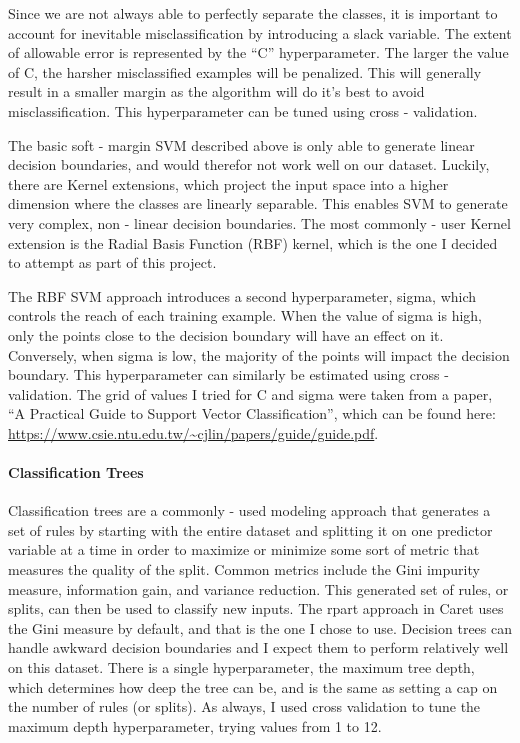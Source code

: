 \documentclass[
]{article}
\begin{document}
Since we are not always able to perfectly separate the classes, it is
important to account for inevitable misclassification by introducing a
slack variable. The extent of allowable error is represented by the
``C'' hyperparameter. The larger the value of C, the harsher
misclassified examples will be penalized. This will generally result in
a smaller margin as the algorithm will do it's best to avoid
misclassification. This hyperparameter can be tuned using cross -
validation.

The basic soft - margin SVM described above is only able to generate
linear decision boundaries, and would therefor not work well on our
dataset. Luckily, there are Kernel extensions, which project the input
space into a higher dimension where the classes are linearly separable.
This enables SVM to generate very complex, non - linear decision
boundaries. The most commonly - user Kernel extension is the Radial
Basis Function (RBF) kernel, which is the one I decided to attempt as
part of this project.

The RBF SVM approach introduces a second hyperparameter, sigma, which
controls the reach of each training example. When the value of sigma is
high, only the points close to the decision boundary will have an effect
on it. Conversely, when sigma is low, the majority of the points will
impact the decision boundary. This hyperparameter can similarly be
estimated using cross - validation. The grid of values I tried for C and
sigma were taken from a paper, ``A Practical Guide to Support Vector
Classification'', which can be found here:
\url{https://www.csie.ntu.edu.tw/~cjlin/papers/guide/guide.pdf}.

\hypertarget{classification-trees}{%
\paragraph{Classification Trees}\label{classification-trees}}

Classification trees are a commonly - used modeling approach that
generates a set of rules by starting with the entire dataset and
splitting it on one predictor variable at a time in order to maximize or
minimize some sort of metric that measures the quality of the split.
Common metrics include the Gini impurity measure, information gain, and
variance reduction. This generated set of rules, or splits, can then be
used to classify new inputs. The rpart approach in Caret uses the Gini
measure by default, and that is the one I chose to use. Decision trees
can handle awkward decision boundaries and I expect them to perform
relatively well on this dataset. There is a single hyperparameter, the
maximum tree depth, which determines how deep the tree can be, and is
the same as setting a cap on the number of rules (or splits). As always,
I used cross validation to tune the maximum depth hyperparameter, trying
values from 1 to 12.
\end{document}
